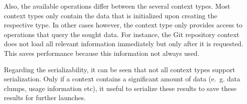 Also, the available operations differ between  the several context types. Most context types only contain the data that is initialized upon creating the respective type. In other cases however, the context type only provides access to operations that query the sought data. For instance, the Git repository context does not load all relevant information immediately but only after it is requested. This saves performance because this information not always used. 

Regarding the serializability, it can be seen that not all context types support serialization. Only if a context contains a significant amount of data (e.~g. data clumps, usage information etc), it useful to serialize these results to save these results for further launches. 
